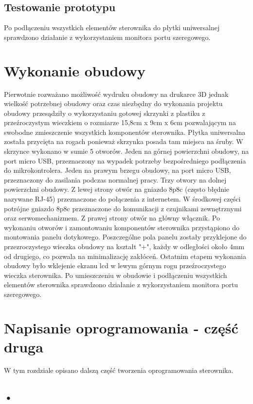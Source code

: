 \documentclass[11pt]{report}
\begin{document}
 \section{Testowanie prototypu}
 Po podłączeniu wszystkich elementów sterownika do płytki uniwersalnej sprawdzono działanie z wykorzystaniem monitora portu szeregowego.
 
 \chapter{Wykonanie obudowy}
 Pierwotnie rozważano możliwość wydruku obudowy na drukarce 3D jednak wielkość potrzebnej obudowy oraz czas niezbędny do wykonania projektu obudowy przesądziły o wykorzystaniu gotowej skrzynki z plastiku z przeźroczystym wieczkiem o rozmiarze 15,8cm x 9cm x 6cm pozwalającym na swobodne zmieszczenie wszystkich komponentów sterownika. Płytka uniwersalna została przycięta na rogach ponieważ skrzynka posada tam miejsca na śruby. W skrzynce wykonano w sumie 5 otworów. Jeden na górnej powierzchni obudowy, na port micro USB, przeznaczony na wypadek potrzeby bezpośredniego podłączenia do mikrokontrolera. Jeden na prawym brzegu obudowy, na port micro USB, przeznaczony do zasilania podczas normalnej pracy. Trzy otwory na dolnej powierzchni obudowy. Z lewej strony otwór na gniazdo 8p8c (często błędnie nazywane RJ-45) przeznaczone do połączenia z internetem. W środkowej części potrójne gniazdo 8p8c przeznaczone do komunikacji z czujnikami zewnętrznymi oraz serwomechanizmem. Z prawej strony otwór na główny włącznik.
 Po wykonaniu otworów i zamontowaniu komponentów sterownika przystąpiono do montowania panelu dotykowego. Poszczególne pola panelu zostały przyklejone do przezroczystego wieczka obudowy na kształt "+", każdy w odległości około 4mm od drugiego, co pozwala na minimalizację zakłóceń.
 Ostatnim etapem wykonania obudowy było wklejenie ekranu lcd w lewym górnym rogu przeźroczystego wieczka sterownika.
 Po umieszczeniu w obudowie i podłączeniu wszystkich elementów sterownika sprawdzono działanie z wykorzystaniem monitora portu szeregowego.
 
 \chapter{Napisanie oprogramowania - część druga}\label{prog:2}
 W tym rozdziale opisano dalszą część tworzenia oprogramowania sterownika. 
 \section{•}
 
\end{document}
